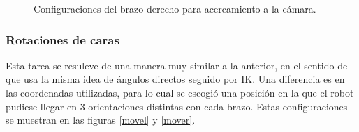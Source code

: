 \begin{figure}[h!]
	\centering
	\hfill
	\hfill
	\caption{Configuraciones del brazo derecho para acercamiento a la cámara.}
	\label{camr}
\end{figure}

\subsubsection{Rotaciones de caras}
Esta tarea se resuleve de una manera muy similar a la anterior, en el sentido de que usa la misma idea de ángulos directos seguido por IK. Una diferencia es en las coordenadas utilizadas, para lo cual se escogió una posición en la que el robot pudiese llegar en 3 orientaciones distintas con cada brazo. Estas configuraciones se muestran en las figuras \ref{movel} y \ref{mover}.

